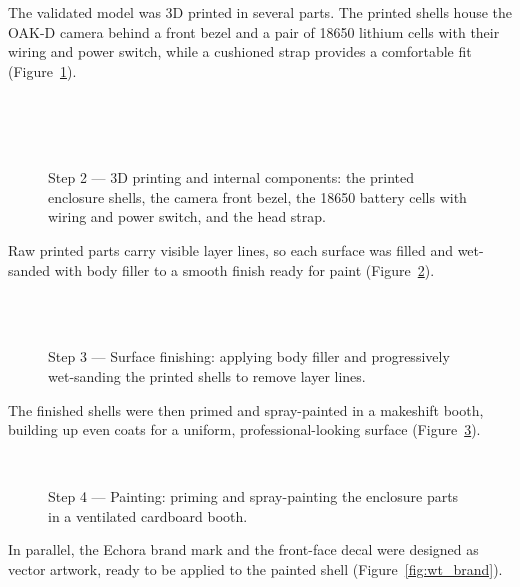 The validated model was 3D printed in several parts. The printed shells house the OAK-D camera behind a front bezel and a pair of 18650 lithium cells with their wiring and power switch, while a cushioned strap provides a comfortable fit (Figure~\ref{fig:wt_print}).

\begin{figure}[H]
\centering
{}\hfill{}\hfill{}\\[4pt]
\hfill{}\hfill{}\\[4pt]
\hfill{}\hfill{}\\[4pt]
\caption{Step 2 --- 3D printing and internal components: the printed enclosure shells, the camera front bezel, the 18650 battery cells with wiring and power switch, and the head strap.}
\label{fig:wt_print}
\end{figure}

Raw printed parts carry visible layer lines, so each surface was filled and wet-sanded with body filler to a smooth finish ready for paint (Figure~\ref{fig:wt_sanding}).

\begin{figure}[H]
\centering
{}\hfill{}\hfill{}\\[4pt]
\hfill{}\hfill{}\\[4pt]
\caption{Step 3 --- Surface finishing: applying body filler and progressively wet-sanding the printed shells to remove layer lines.}
\label{fig:wt_sanding}
\end{figure}

The finished shells were then primed and spray-painted in a makeshift booth, building up even coats for a uniform, professional-looking surface (Figure~\ref{fig:wt_paint}).

\begin{figure}[H]
\centering
{}\hfill{}\hfill{}\\[4pt]
\hfill{}\hfill{}
\caption{Step 4 --- Painting: priming and spray-painting the enclosure parts in a ventilated cardboard booth.}
\label{fig:wt_paint}
\end{figure}

In parallel, the Echora brand mark and the front-face decal were designed as vector artwork, ready to be applied to the painted shell (Figure~\ref{fig:wt_brand}).

